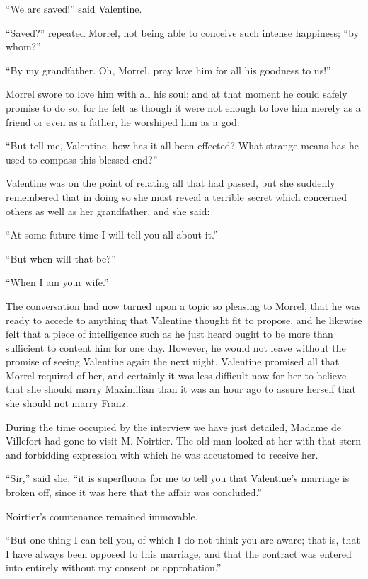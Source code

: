 “We are saved!” said Valentine.

“Saved?” repeated Morrel, not being able to conceive such intense
happiness; “by whom?”

“By my grandfather. Oh, Morrel, pray love him for all his goodness to
us!”

Morrel swore to love him with all his soul; and at that moment he could
safely promise to do so, for he felt as though it were not enough to
love him merely as a friend or even as a father, he worshiped him as a
god.

“But tell me, Valentine, how has it all been effected? What strange
means has he used to compass this blessed end?”

Valentine was on the point of relating all that had passed, but she
suddenly remembered that in doing so she must reveal a terrible secret
which concerned others as well as her grandfather, and she said:

“At some future time I will tell you all about it.”

“But when will that be?”

“When I am your wife.”

The conversation had now turned upon a topic so pleasing to Morrel,
that he was ready to accede to anything that Valentine thought fit to
propose, and he likewise felt that a piece of intelligence such as he
just heard ought to be more than sufficient to content him for one day.
However, he would not leave without the promise of seeing Valentine
again the next night. Valentine promised all that Morrel required of
her, and certainly it was less difficult now for her to believe that
she should marry Maximilian than it was an hour ago to assure herself
that she should not marry Franz.

During the time occupied by the interview we have just detailed, Madame
de Villefort had gone to visit M. Noirtier. The old man looked at her
with that stern and forbidding expression with which he was accustomed
to receive her.

“Sir,” said she, “it is superfluous for me to tell you that Valentine’s
marriage is broken off, since it was here that the affair was
concluded.”

Noirtier’s countenance remained immovable.

“But one thing I can tell you, of which I do not think you are aware;
that is, that I have always been opposed to this marriage, and that the
contract was entered into entirely without my consent or approbation.”

